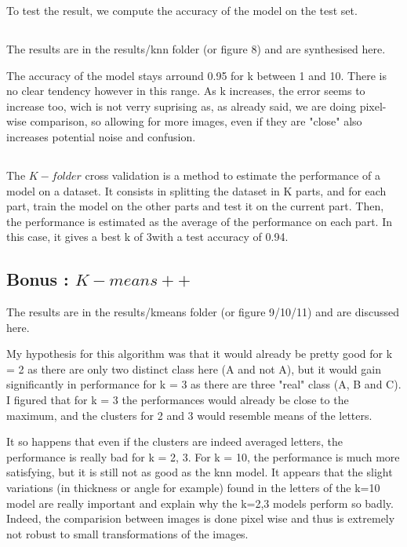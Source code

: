 \documentclass{article}
\begin{document}
To test the result, we compute the accuracy of the model on the test set.

\subsection{}

The results are in the results/knn folder (or figure 8) and are synthesised here.

The accuracy of the model stays arround 0.95 for k between 1 and 10. There is no clear tendency however in this range. As k increases, the error seems to increase too, wich is not verry suprising as, as already said, we are doing pixel-wise comparison, so allowing for more images, even if they are "close" also increases potential noise and confusion.

\subsection{}

The $K-folder$ cross validation is a method to estimate the performance of a model on a dataset. It consists in splitting the dataset in K parts, and for each part, train the model on the other parts and test it on the current part. Then, the performance is estimated as the average of the performance on each part.
In this case, it gives a best k of 3with a test accuracy of 0.94.

\subsection{Bonus : $K-means++$}

The results are in the results/kmeans folder (or figure 9/10/11) and are discussed here.\newline

My hypothesis for this algorithm was that it would already be pretty good for k = 2 as there are only two distinct class here (A and not A), but it would gain significantly in performance for k = 3 as there are three "real" class (A, B and C).
I figured that for k = 3 the performances would already be close to the maximum, and the clusters for 2 and 3 would resemble means of the letters.\newline

It so happens that even if the clusters are indeed averaged letters, the performance is really bad for k = 2, 3.
For k = 10, the performance is much more satisfying, but it is still not as good as the knn model.
It appears that the slight variations (in thickness or angle for example) found in the letters of the k=10 model are really important and explain why the k=2,3 models perform so badly. Indeed, the comparision between images is done pixel wise and thus is extremely not robust to small transformations of the images.
\end{document}
